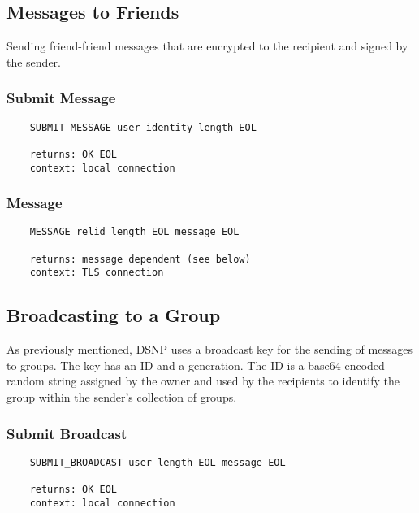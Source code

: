 \documentclass[letterpaper,11pt,oneside]{article}
\begin{document}
\subsection{Messages to Friends}

Sending friend-friend messages that are encrypted to the recipient and signed
by the sender. 

\subsubsection{Submit Message}

\vspace{10pt}
\begin{verbatim}
    SUBMIT_MESSAGE user identity length EOL

    returns: OK EOL
    context: local connection
\end{verbatim}
\vspace{10pt}

\subsubsection{Message}

\vspace{10pt}
\begin{verbatim}
    MESSAGE relid length EOL message EOL

    returns: message dependent (see below)
    context: TLS connection
\end{verbatim}

\subsection{Broadcasting to a Group}

As previously mentioned, DSNP uses a broadcast key for the sending of messages
to groups. The key has an ID and a generation. The ID is a base64 encoded
random string assigned by the owner and used by the recipients to identify the
group within the sender's collection of groups.

\subsubsection{Submit Broadcast}

\vspace{10pt}
\begin{verbatim}
    SUBMIT_BROADCAST user length EOL message EOL

    returns: OK EOL
    context: local connection
\end{verbatim}
\vspace{10pt}
\end{document}
